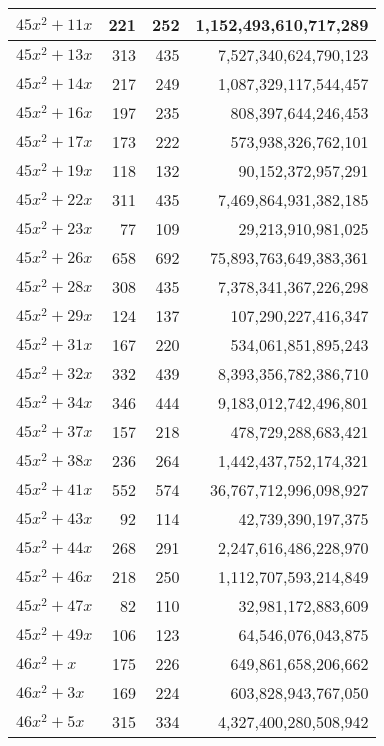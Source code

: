 \documentclass[a4paper]{amsproc}
\theoremstyle{plain}
\begin{document}
\begin{longtable}{ | l | r | r | r | }
$45x^2 + 11x$ & 221 & 252 & 1{,}152{,}493{,}610{,}717{,}289 \\ \hline
$45x^2 + 13x$ & 313 & 435 & 7{,}527{,}340{,}624{,}790{,}123 \\ \hline
$45x^2 + 14x$ & 217 & 249 & 1{,}087{,}329{,}117{,}544{,}457 \\ \hline
$45x^2 + 16x$ & 197 & 235 & 808{,}397{,}644{,}246{,}453 \\ \hline
$45x^2 + 17x$ & 173 & 222 & 573{,}938{,}326{,}762{,}101 \\ \hline
$45x^2 + 19x$ & 118 & 132 & 90{,}152{,}372{,}957{,}291 \\ \hline
$45x^2 + 22x$ & 311 & 435 & 7{,}469{,}864{,}931{,}382{,}185 \\ \hline
$45x^2 + 23x$ & 77 & 109 & 29{,}213{,}910{,}981{,}025 \\ \hline
$45x^2 + 26x$ & 658 & 692 & 75{,}893{,}763{,}649{,}383{,}361 \\ \hline
$45x^2 + 28x$ & 308 & 435 & 7{,}378{,}341{,}367{,}226{,}298 \\ \hline
$45x^2 + 29x$ & 124 & 137 & 107{,}290{,}227{,}416{,}347 \\ \hline
$45x^2 + 31x$ & 167 & 220 & 534{,}061{,}851{,}895{,}243 \\ \hline
$45x^2 + 32x$ & 332 & 439 & 8{,}393{,}356{,}782{,}386{,}710 \\ \hline
$45x^2 + 34x$ & 346 & 444 & 9{,}183{,}012{,}742{,}496{,}801 \\ \hline
$45x^2 + 37x$ & 157 & 218 & 478{,}729{,}288{,}683{,}421 \\ \hline
$45x^2 + 38x$ & 236 & 264 & 1{,}442{,}437{,}752{,}174{,}321 \\ \hline
$45x^2 + 41x$ & 552 & 574 & 36{,}767{,}712{,}996{,}098{,}927 \\ \hline
$45x^2 + 43x$ & 92 & 114 & 42{,}739{,}390{,}197{,}375 \\ \hline
$45x^2 + 44x$ & 268 & 291 & 2{,}247{,}616{,}486{,}228{,}970 \\ \hline
$45x^2 + 46x$ & 218 & 250 & 1{,}112{,}707{,}593{,}214{,}849 \\ \hline
$45x^2 + 47x$ & 82 & 110 & 32{,}981{,}172{,}883{,}609 \\ \hline
$45x^2 + 49x$ & 106 & 123 & 64{,}546{,}076{,}043{,}875 \\ \hline
$46x^2 + x$ & 175 & 226 & 649{,}861{,}658{,}206{,}662 \\ \hline
$46x^2 + 3x$ & 169 & 224 & 603{,}828{,}943{,}767{,}050 \\ \hline
$46x^2 + 5x$ & 315 & 334 & 4{,}327{,}400{,}280{,}508{,}942 \\ \hline

\end{longtable}
\end{document}
